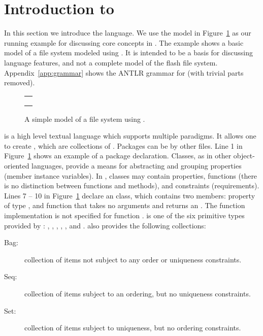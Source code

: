 \section{Introduction to \Klang{}}
\label{sec:k-syntax}

In this section we introduce the \Klang{} language. We use the
\Klang{} model in Figure~\ref{fig:fs} as our running example for
discussing core concepts in \Klang{}. The example shows a basic model
of a file system modeled using \Klang{}. It is intended to be a
basis for discussing language features, and not a complete model of
the flash file system. Appendix~\ref{app:grammar} shows the ANTLR
grammar for \Klang{} (with trivial parts removed).

\begin{figure}
\centering
\begin{tabular}{c}
\hline \\
 \\ \\
\hline
\end{tabular}
\caption{A simple model of a file system using \Klang{}.}
\label{fig:fs}
\end{figure}

\Klang{} is a high level textual language which supports multiple
paradigms. It allows one to create , which are
collections of . Packages can be  by
other \Klang{} files. Line 1 in Figure~\ref{fig:fs} shows an example
of a package declaration. Classes, as in other object-oriented languages, provide
a means for abstracting and grouping properties (member instance
variables). In \Klang{}, classes may contain properties, functions (there is no
distinction between functions and methods), and
constraints (requirements). Lines 7 -- 10 in Figure~\ref{fig:fs}
declare an  class, which contains two members: property
 of type , and function  that takes
no arguments and returns an . The function implementation is
not specified for function .  is one of the
six primitive types provided by \Klang{}: , ,
, , , and . \Klang{}
also provides the following collections:

\begin{description}
\item [Bag:] collection of items not subject to any order
  or uniqueness constraints.
\item [Seq:] collection of items subject to an ordering, but
  no uniqueness constraints.
\item [Set:] collection of items subject to uniqueness, but no
  ordering constraints.
\end{description}

